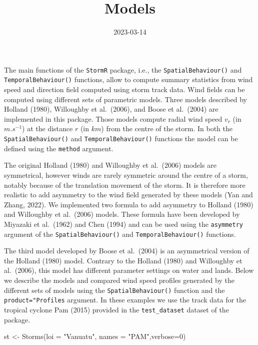 \documentclass[
]{article}
\title{Models}
\author{}
\date{\vspace{-2.5em}2023-03-14}
\newenvironment{Shaded}{\begin{snugshade}}{\end{snugshade}}
\newcommand{\AttributeTok}[1]{\textcolor[rgb]{0.77,0.63,0.00}{#1}}
\newcommand{\DecValTok}[1]{\textcolor[rgb]{0.00,0.00,0.81}{#1}}
\newcommand{\FunctionTok}[1]{\textcolor[rgb]{0.00,0.00,0.00}{#1}}
\newcommand{\NormalTok}[1]{#1}
\newcommand{\OtherTok}[1]{\textcolor[rgb]{0.56,0.35,0.01}{#1}}
\newcommand{\StringTok}[1]{\textcolor[rgb]{0.31,0.60,0.02}{#1}}
\begin{document}
\maketitle

The main functions of the \texttt{StormR} package, i.e., the
\texttt{SpatialBehaviour()} and \texttt{TemporalBehaviour()} functions,
allow to compute summary statistics from wind speed and direction field
computed using storm track data. Wind fields can be computed using
different sets of parametric models. Three models described by Holland
(1980), Willoughby et al.~(2006), and Boose et al.~(2004) are
implemented in this package. Those models compute radial wind speed
\(v_r\) (in \(m.s^{-1}\)) at the distance \(r\) (in \(km\)) from the
centre of the storm. In both the \texttt{SpatialBehaviour()} and
\texttt{TemporalBehaviour()} functions the model can be defined using
the \texttt{method} argument.

The original Holland (1980) and Willoughby et al.~(2006) models are
symmetrical, however winds are rarely symmetric around the centre of a
storm, notably because of the translation movement of the storm. It is
therefore more realistic to add asymmetry to the wind field generated by
these models (Yan and Zhang, 2022). We implemented two formula to add
asymmetry to Holland (1980) and Willoughby et al.~(2006) models. These
formula have been developed by Miyazaki et al.~(1962) and Chen (1994)
and can be used using the \texttt{asymmetry} argument of the
\texttt{SpatialBehaviour()} and \texttt{TemporalBehaviour()} functions.

The third model developed by Boose et al.~(2004) is an asymmetrical
version of the Holland (1980) model. Contrary to the Holland (1980) and
Willoughby et al.~(2006), this model has different parameter settings on
water and lands. Below we describe the models and compared wind speed
profiles generated by the different sets of models using the
\texttt{SpatialBehaviour()} function and the \texttt{product="Profiles}
argument. In these examples we use the track data for the tropical
cyclone Pam (2015) provided in the \texttt{test\_dataset} dataset of the
package.

\begin{Shaded}
\begin{Highlighting}[]
\NormalTok{st }\OtherTok{\textless{}{-}} \FunctionTok{Storms}\NormalTok{(}\AttributeTok{loi =} \StringTok{"Vanuatu"}\NormalTok{, }\AttributeTok{names =} \StringTok{"PAM"}\NormalTok{,}\AttributeTok{verbose=}\DecValTok{0}\NormalTok{)}
\end{Highlighting}
\end{Shaded}
\end{document}
